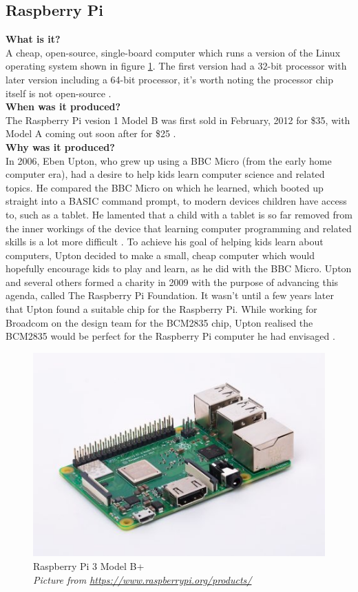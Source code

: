 \subsection{Raspberry Pi}


\textbf{What is it?}\\
A cheap, open-source, single-board computer which runs a version of the Linux operating system shown in figure \ref{Raspberry_Pi}. The first version had a 32-bit processor with later version including a 64-bit processor, it's worth noting the processor chip itself is not open-source
\cite{RN99}.\\

\textbf{When was it produced?}\\
The Raspberry Pi vesion 1 Model B was first sold in February, 2012 for \$35, with Model A coming out soon after for \$25 \cite{RN100}.\\

\textbf{Why was it produced?}\\
In 2006, Eben Upton, who grew up using a BBC Micro (from the early home computer era), had a desire to help kids learn computer science and related topics. He compared the BBC Micro on which he learned, which booted up straight into a BASIC command prompt, to modern devices children have access to, such as a tablet. He lamented that a child with a tablet is so far removed from the inner workings of the device that learning computer programming and related skills is a lot more difficult \cite{RN97}. To achieve his goal of helping kids learn about computers, Upton decided to make a small, cheap computer which would hopefully encourage kids to play and learn, as he did with the BBC Micro. Upton and several others formed a charity in 2009 with the purpose of advancing this agenda, called The Raspberry Pi Foundation. It wasn't until a few years later that Upton found a suitable chip for the Raspberry Pi. While working for Broadcom on the design team for the BCM2835 chip, Upton realised the BCM2835 would be perfect for the Raspberry Pi computer he had envisaged
\cite{RN97}.\\

\begin{figure} \begin{center}
\includegraphics[width=.3\linewidth]{pics/Raspberry_Pi_3B+} 
\end{center} 
\caption{Raspberry Pi 3 Model B+\\ \textit{\small{Picture from \url{https://www.raspberrypi.org/products/}}}}
\label{Raspberry_Pi}
\end{figure} 

